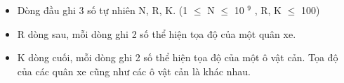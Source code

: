 \begin{itemize}
	\item     Dòng đầu ghi 3 số tự nhiên N, R, K. (1  $\le$  N  $\le$  10    $^     9    $    , R, K  $\le$  100)   
	\item     R dòng sau, mỗi dòng ghi 2 số thể hiện tọa độ của một quân xe.   
	\item     K dòng cuối, mỗi dòng ghi 2 số thể hiện tọa độ của một ô vật cản. Tọa độ của các quân xe cũng như các ô vật cản là khác nhau.   
\end{itemize}